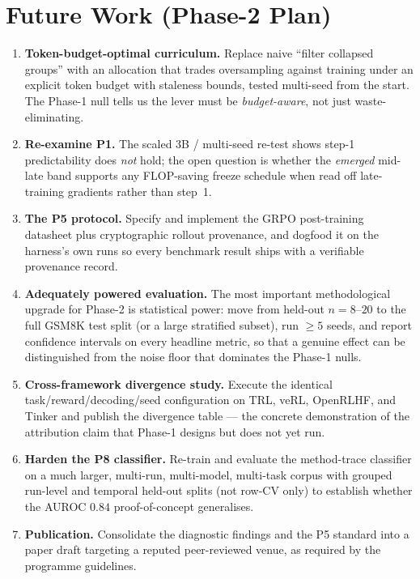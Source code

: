\documentclass[12pt,a4paper]{report}
\begin{document}
\section{Future Work (Phase-2 Plan)}
\begin{enumerate}[leftmargin=1.6em,itemsep=3pt]
  \item \textbf{Token-budget-optimal curriculum.} Replace naive ``filter collapsed
  groups'' with an allocation that trades oversampling against training under an
  explicit token budget with staleness bounds, tested multi-seed from the start. The
  Phase-1 null tells us the lever must be \emph{budget-aware}, not just
  waste-eliminating.
  \item \textbf{Re-examine P1.} The scaled 3B / multi-seed re-test shows step-1
  predictability does \emph{not} hold; the open question is whether the \emph{emerged}
  mid-late band supports any FLOP-saving freeze schedule when read off late-training
  gradients rather than step~1.
  \item \textbf{The P5 protocol.} Specify and implement the GRPO post-training
  datasheet plus cryptographic rollout provenance, and dogfood it on the harness's own
  runs so every benchmark result ships with a verifiable provenance record.
  \item \textbf{Adequately powered evaluation.} The most important methodological
  upgrade for Phase-2 is statistical power: move from held-out $n=8$--$20$ to the full
  GSM8K test split (or a large stratified subset), run $\ge 5$ seeds, and report
  confidence intervals on every headline metric, so that a genuine effect can be
  distinguished from the noise floor that dominates the Phase-1 nulls.
  \item \textbf{Cross-framework divergence study.} Execute the identical
  task/reward/decoding/seed configuration on TRL, veRL, OpenRLHF, and Tinker and publish
  the divergence table --- the concrete demonstration of the attribution claim that
  Phase-1 designs but does not yet run.
  \item \textbf{Harden the P8 classifier.} Re-train and evaluate the method-trace
  classifier on a much larger, multi-run, multi-model, multi-task corpus with grouped
  run-level and temporal held-out splits (not row-CV only) to
  establish whether the AUROC $0.84$ proof-of-concept generalises.
  \item \textbf{Publication.} Consolidate the diagnostic findings and the P5 standard
  into a paper draft targeting a reputed peer-reviewed venue, as required by the
  programme guidelines.
\end{enumerate}
\end{document}
